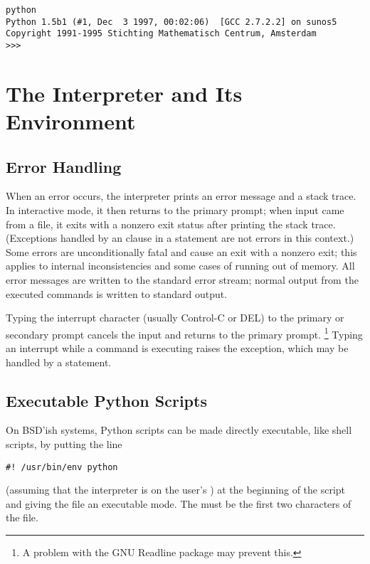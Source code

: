 \documentclass{manual}
\begin{document}
\begin{verbatim}
python
Python 1.5b1 (#1, Dec  3 1997, 00:02:06)  [GCC 2.7.2.2] on sunos5
Copyright 1991-1995 Stichting Mathematisch Centrum, Amsterdam
>>>
\end{verbatim}

\section{The Interpreter and Its Environment}
\label{interp}

\subsection{Error Handling}
\label{error}

When an error occurs, the interpreter prints an error
message and a stack trace.  In interactive mode, it then returns to
the primary prompt; when input came from a file, it exits with a
nonzero exit status after printing
the stack trace.  (Exceptions handled by an  clause in a
 statement are not errors in this context.)  Some errors are
unconditionally fatal and cause an exit with a nonzero exit; this
applies to internal inconsistencies and some cases of running out of
memory.  All error messages are written to the standard error stream;
normal output from the executed commands is written to standard
output.

Typing the interrupt character (usually Control-C or DEL) to the
primary or secondary prompt cancels the input and returns to the
primary prompt.%
\footnote{
        A problem with the GNU Readline package may prevent this.
}
Typing an interrupt while a command is executing raises the
 exception, which may be handled by a
 statement.

\subsection{Executable Python Scripts}
\label{scripts}

On BSD'ish \UNIX{} systems, Python scripts can be made directly
executable, like shell scripts, by putting the line

\begin{verbatim}
#! /usr/bin/env python
\end{verbatim}

(assuming that the interpreter is on the user's ) at the
beginning of the script and giving the file an executable mode.  The
\samp{\#!} must be the first two characters of the file.
\end{document}
